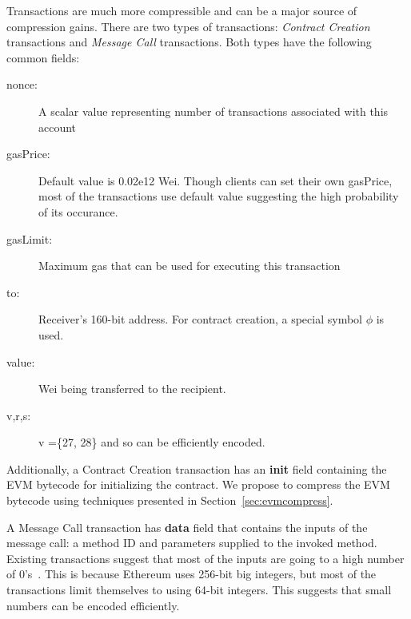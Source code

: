 Transactions are much more compressible and can be a major source of compression gains.
There are two types of transactions: {\em Contract Creation} transactions and {\em Message Call} transactions.
Both types have the following common fields:
\begin{description}
  \item[nonce:] A scalar value representing number of transactions associated with this account
  \item[gasPrice:] Default value is 0.02e12 Wei. Though clients can set their own gasPrice, most of the transactions use default value suggesting the high probability of its occurance.
  \item[gasLimit:] Maximum gas that can be used for executing this transaction
  \item[to:] Receiver's 160-bit address. For contract creation, a special symbol $\phi$ is used.
  \item[value:] Wei being transferred to the recipient.
  \item[v,r,s:] v =\{27, 28\} and so can be efficiently encoded.
\end{description}

Additionally, a Contract Creation transaction has an \textbf{init} field containing the EVM bytecode for initializing the contract.
We propose to compress the EVM bytecode using techniques presented in Section~\ref{sec:evmcompress}.

A Message Call transaction has \textbf{data} field that contains the inputs of the message call: a method ID and parameters supplied to the invoked method.
Existing transactions suggest that most of the inputs are going to a high number of 0's~\cite{ethtx}. 
This is because Ethereum uses 256-bit big integers, but most of the transactions limit themselves to using 64-bit integers.
This suggests that small numbers can be encoded efficiently.


%

